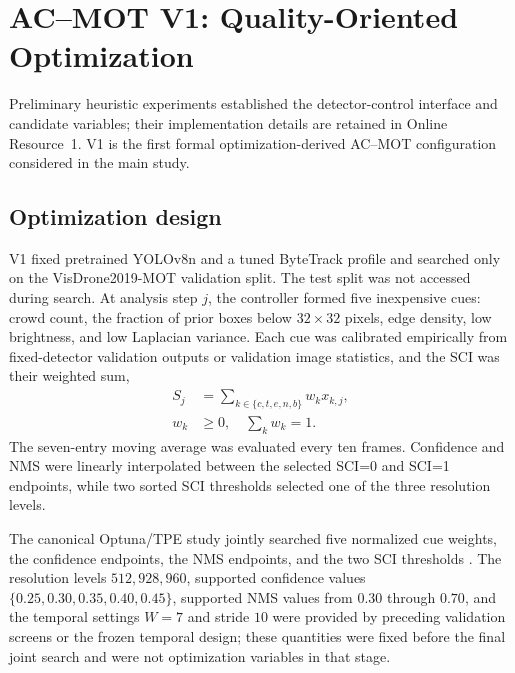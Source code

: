 \section{AC--MOT V1: Quality-Oriented Optimization}
Preliminary heuristic experiments established the detector-control interface
and candidate variables; their implementation details are retained in Online
Resource~1. V1 is the first formal optimization-derived AC--MOT configuration
considered in the main study.

\subsection{Optimization design}
V1 fixed pretrained YOLOv8n and a tuned ByteTrack profile and searched only on
the VisDrone2019-MOT validation split. The test split was not accessed during
search. At analysis step $j$, the controller formed five inexpensive cues:
crowd count, the fraction of prior boxes below $32\times32$ pixels, edge
density, low brightness, and low Laplacian variance. Each cue was calibrated
empirically from fixed-detector validation outputs or validation image
statistics, and the SCI was their weighted sum,
\begin{equation}
\begin{aligned}
S_j&=\sum_{k\in\{c,t,e,n,b\}}w_k x_{k,j},\\
w_k&\geq0,\quad\sum_k w_k=1.
\end{aligned}
\end{equation}
The seven-entry moving average was evaluated every ten frames. Confidence and
NMS were linearly interpolated between the selected SCI=0 and SCI=1 endpoints,
while two sorted SCI thresholds selected one of the three resolution levels.

The canonical Optuna/TPE study jointly searched five normalized cue weights,
the confidence endpoints, the NMS endpoints, and the two SCI thresholds
\cite{akiba2019optuna}. The resolution levels $512,928,960$, supported
confidence values $\{0.25,0.30,0.35,0.40,0.45\}$, supported NMS values from
$0.30$ through $0.70$, and the temporal settings $W=7$ and stride $10$ were
provided by preceding validation screens or the frozen temporal design; these
quantities were fixed before the final joint search and were not optimization
variables in that stage.


